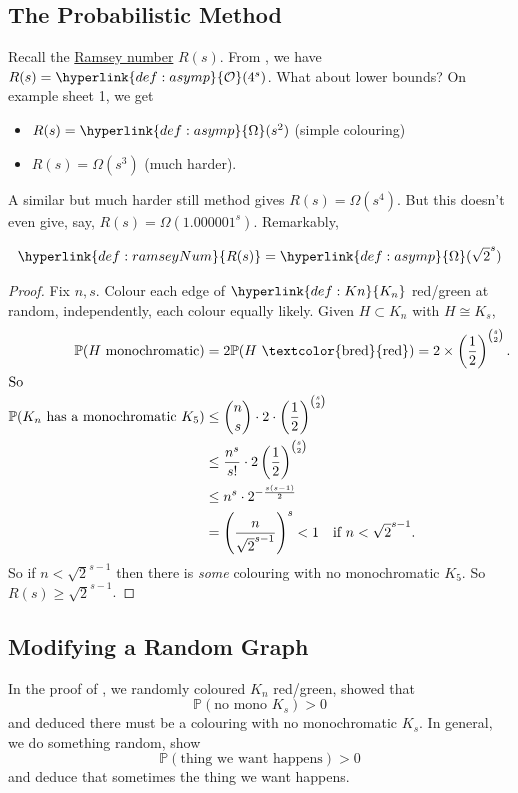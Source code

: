 \documentclass{article}
\newcommand{\red}[1]{\textcolor{bred}{#1}}
\newcommand{\green}[1]{\textcolor{bgreen}{#1}}
\begin{document}
\subsection{The Probabilistic Method}
Recall the \hyperlink{def:ramseyNum}{Ramsey number} $R(s)$.
From , we have $R(s) = \hyperlink{def:asymp}{\mathcal{O}}(4^s)$.
What about lower bounds?
On example sheet 1, we get
\begin{itemize}
    \item $R(s) = \hyperlink{def:asymp}{\Omega}(s^2)$ (simple colouring)
    \item $R(s) = \Omega(s^3)$ (much harder).
\end{itemize}
A similar but much harder still method gives $R(s) = \Omega(s^4)$.
But this doesn't even give, say, $R(s) = \Omega(1.000001^s)$.
Remarkably,
\begin{nthm}[Erd\H{o}s]\label{thm:37}
    \begin{equation*}
        \hyperlink{def:ramseyNum}{R(s)} = \hyperlink{def:asymp}{\Omega}(\sqrt{2}^s)
    \end{equation*}
\end{nthm}
\begin{proof}
    Fix $n,s$. Colour each edge of $\hyperlink{def:Kn}{K_n}$ \red{red}/\green{green} at random, independently, each colour equally likely.
    Given $H \subset K_n$ with $H \cong K_s$,
    \begin{align*}
        \mathbb{P}(H\text{ monochromatic}) &= 2 \mathbb{P}(H\text{ \red{red}}) = 2 \times \left(\frac{1}{2}\right)^{\binom{s}{2}}. \\
        \shortintertext{So}
        \mathbb{P}(K_n \text{ has a monochromatic } K_5) &\leq \binom{n}{s} \cdot 2 \cdot \left(\frac{1}{2}\right)^{\binom{s}{2}}  \\
                                        &\leq \frac{n^s}{s!} \cdot 2 \left(\frac{1}{2}\right)^{\binom{s}{2}} \\
                                        &\leq n^s \cdot 2^{-\frac{s(s-1)}{2}} \\
                                        &= \left(\frac{n}{\sqrt{2}^{s-1}}\right)^s < 1 \quad \text{if $n < \sqrt{2}^{s-1}$.}
    \end{align*}
    So if $n < \sqrt{2}^{s-1}$ then there is \emph{some} colouring with no monochromatic $K_5$.
    So $R(s) \geq \sqrt{2}^{s-1}$.
\end{proof}

\subsection{Modifying a Random Graph}
In the proof of , we randomly coloured \hyperlink{def:Kn}{$K_n$} \red{red}/\green{green}, showed that
\begin{equation*}
    \mathbb{P}(\text{no mono }K_s) > 0
\end{equation*}
and deduced there must be a colouring with no monochromatic $K_s$.
In general, we do something random, show
\begin{equation*}
    \mathbb{P}(\text{thing we want happens}) > 0 \tag{$*$} \label{eq:5.2star}
\end{equation*}
and deduce that sometimes the thing we want happens.
\end{document}
